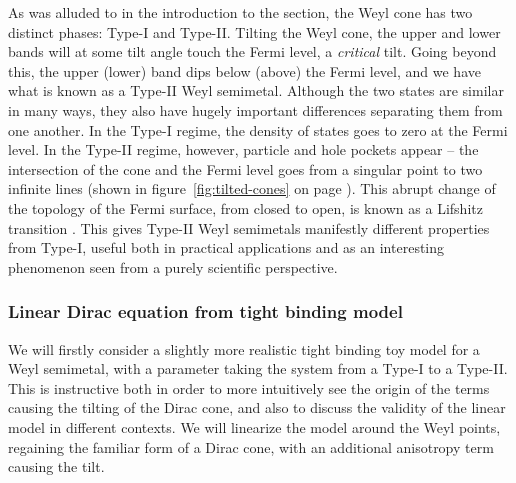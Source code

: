 As was alluded to in the introduction to the section, the Weyl cone has two distinct phases: Type-I and
Type-II.
Tilting the Weyl cone, the upper and lower bands will at some tilt angle touch the Fermi level, a \emph{critical} tilt.
Going beyond this, the upper (lower) band dips below (above) the Fermi level, and we have what is known as a Type-II Weyl semimetal.
Although the two states are similar in many ways, they also have hugely important differences separating them from one another.
In the Type-I regime, the density of states goes to zero at the Fermi level.
In the Type-II regime, however, particle and hole pockets appear -- the intersection of the cone and the Fermi level goes from a singular point to two infinite lines (shown in figure~\ref{fig:tilted-cones} on page \pageref{fig:tilted-cones}).
This abrupt change of the topology of the Fermi surface, from closed to open, is known as a Lifshitz transition \cite{volovikTopologicalLifshitzTransitions2017}.
This gives Type-II Weyl semimetals manifestly different properties from Type-I, useful both in practical applications and as an interesting phenomenon seen from a purely scientific perspective.


\subsubsection{Linear Dirac equation from tight binding model}
\label{sec:tilt:tightbindingmodel}
We will firstly consider a slightly more realistic tight binding toy model for a Weyl semimetal, with a parameter taking the system from a Type-I to a Type-II.
This is instructive both in order to more intuitively see the origin of the terms causing the tilting of the Dirac cone, and also to discuss the validity of the linear model in different contexts.
We will linearize the model around the Weyl points, regaining the familiar form of a Dirac cone, with an additional anisotropy term causing the tilt.

